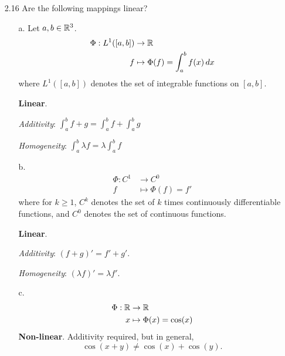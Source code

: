 \documentclass[11pt]{article}
\begin{document}
\begin{enumerate}
    \item[2.16] Are the following mappings linear?

          \begin{enumerate}
              \item[a.] Let $a, b \in \mathbb{R}^3$.
                    \[
                        \begin{aligned}
                            \Phi : L^1([a, b]) & \rightarrow \mathbb{R}                            \\
                            f                  & \mapsto \Phi(f) = \int_{a}^{b} f(x) \, dx
                        \end{aligned}
                    \]
                    where $L^1([a, b])$ denotes the set of integrable functions on $[a, b]$.

                    \textbf{Linear}.

                    \textit{Additivity}: $\int_{a}^{b} f + g = \int_{a}^{b} f + \int_{a}^{b} g $

                    \textit{Homogeneity}: $\int_{a}^{b} \lambda f = \lambda \int_{a}^{b} f $

              \item[b.]
                    \[
                        \begin{aligned}
                            \Phi : C^1 & \rightarrow C^0      \\
                            f          & \mapsto \Phi(f) = f'
                        \end{aligned}
                    \]
                    where for $k \geq 1$, $C^k$ denotes the set of $k$ times continuously differentiable
                    functions, and $C^0$ denotes the set of continuous functions.

                    \textbf{Linear}.

                    \textit{Additivity}: $(f + g)' = f' + g'$.

                    \textit{Homogeneity}: $(\lambda f)' = \lambda f'$.

              \item[c.]
                    \[
                        \begin{aligned}
                            \Phi : \mathbb{R} & \rightarrow \mathbb{R}            \\
                            x         & \mapsto \Phi(x) = \cos(x)
                        \end{aligned}
                    \]
                    \textbf{Non-linear}.  Additivity required, but in general,
                    \[
                        \cos(x + y) \neq \cos(x) + \cos(y).
                    \]


\end{enumerate}
\end{enumerate}
\end{document}
